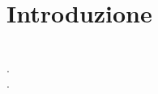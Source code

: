 \documentclass[../main.tex]{subfiles}
\begin{document}
\chapter{Introduzione}
\newpage
\\
.
\newpage
\\
.
\newpage
\end{document}

